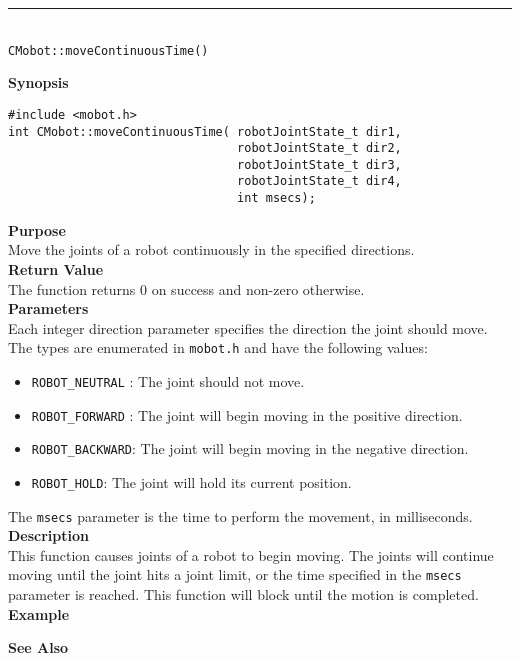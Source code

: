 \noindent
\vspace{5pt}
\rule{4.5in}{0.015in}\\
\noindent
{\LARGE \texttt{CMobot::moveContinuousTime()}}\\
{}

\noindent
{\bf Synopsis}
\vspace{-8pt}
\begin{verbatim}
#include <mobot.h>
int CMobot::moveContinuousTime( robotJointState_t dir1, 
                                robotJointState_t dir2, 
                                robotJointState_t dir3, 
                                robotJointState_t dir4, 
                                int msecs);
\end{verbatim}

\noindent
{\bf Purpose}\\
Move the joints of a robot continuously in the specified directions.\\

\noindent
{\bf Return Value}\\
The function returns 0 on success and non-zero otherwise.\\

\noindent
{\bf Parameters}\\
Each integer direction parameter specifies the direction the joint should move. The types
are enumerated in \texttt{mobot.h} and have the following values:
\begin{itemize}
\item \texttt{ROBOT\_NEUTRAL} : The joint should not move.
\item \texttt{ROBOT\_FORWARD} : The joint will begin moving in the positive direction.
\item \texttt{ROBOT\_BACKWARD}: The joint will begin moving in the negative direction.
\item \texttt{ROBOT\_HOLD}: The joint will hold its current position.
\end{itemize}
The \texttt{msecs} parameter is the time to perform the movement, in milliseconds.
\\

\noindent
{\bf Description}\\
This function causes joints of a robot to begin moving. The joints will continue moving
until the joint hits a joint limit, or the time specified in the \texttt{msecs} parameter
is reached. This function will block until the motion is completed.\\

\noindent
{\bf Example}\\
\noindent

\noindent
{\bf See Also}\\

